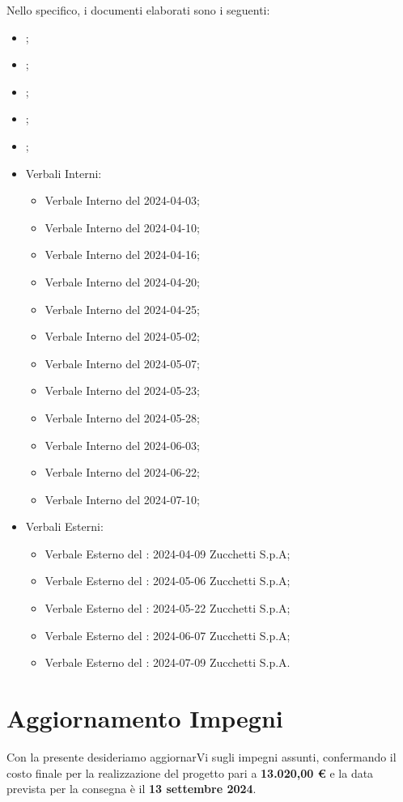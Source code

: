 Nello specifico, i documenti elaborati sono i seguenti: 
\begin{itemize}
    \item \AnalisiDeiRequisiti;
    \item \Glossario;
    \item \NormeDiProgetto;
    \item \PianoDiProgetto;
    \item \PianoDiQualifica; 
    \item Verbali Interni: 
        \begin{itemize}
            \item Verbale Interno del 2024-04-03;
            \item Verbale Interno del 2024-04-10;
            \item Verbale Interno del 2024-04-16;
            \item Verbale Interno del 2024-04-20;
            \item Verbale Interno del 2024-04-25;
            \item Verbale Interno del 2024-05-02;
            \item Verbale Interno del 2024-05-07;
            \item Verbale Interno del 2024-05-23;
            \item Verbale Interno del 2024-05-28;
            \item Verbale Interno del 2024-06-03;
            \item Verbale Interno del 2024-06-22;
            \item Verbale Interno del 2024-07-10;
        \end{itemize}
    \item Verbali Esterni:
    \begin{itemize}
        \item Verbale Esterno del : 2024-04-09 Zucchetti S.p.A;
        \item Verbale Esterno del : 2024-05-06 Zucchetti S.p.A;
        \item Verbale Esterno del : 2024-05-22 Zucchetti S.p.A;
        \item Verbale Esterno del : 2024-06-07 Zucchetti S.p.A;
        \item Verbale Esterno del : 2024-07-09 Zucchetti S.p.A.
    \end{itemize}
\end{itemize}

\section*{Aggiornamento Impegni}
Con la presente desideriamo aggiornarVi sugli impegni assunti, confermando il costo finale per la realizzazione del progetto pari a \textbf{13.020,00 €} e la data prevista per la consegna è il \textbf{13 settembre 2024}. \newline

